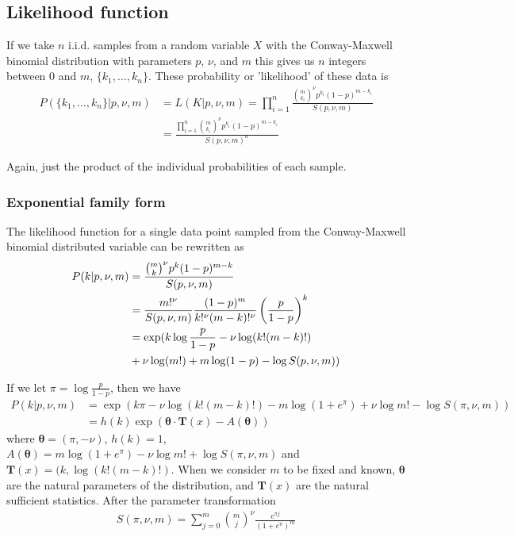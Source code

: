 \documentclass[a4paper,12pt]{article}
\theoremstyle{definition}
\begin{document}
\subsection{Likelihood function}
If we take $n$ i.i.d. samples from a random variable $X$ with the Conway-Maxwell binomial distribution with parameters $p$, $\nu$, and $m$ this gives us $n$ integers between $0$ and $m$, $\lbrace k_1, \dots , k_n \rbrace$. These probability or 'likelihood' of these data is
\begin{align}
  P(\lbrace k_1, \dots, k_n \rbrace | p, \nu, m) &= L(K | p, \nu, m) = \prod_{i=1}^{n} \frac{\binom{m}{k_i}^{\nu} p^{k_i} (1-p)^{m-k_i}}{S(p, \nu, m)} \\ 
  & = \frac{\prod_{i=1}^{n} \binom{m}{k_i}^{\nu} p^{k_i} (1-p)^{m-k_i}}{S(p, \nu, m)^n}
\end{align}

Again, just the product of the individual probabilities of each sample.

\subsubsection{Exponential family form}
The likelihood function for a single data point sampled from the Conway-Maxwell binomial distributed variable can be rewritten as 
\begin{align}
  P(k | p, \nu, m) & = \frac{\binom{m}{k}^{\nu} p^{k} (1-p)^{m-k}}{S(p, \nu, m)} \\
  & = \frac{m!^{\nu}}{S(p, \nu, m)} \frac{(1-p)^{m}}{k!^{\nu}(m - k)!^{\nu}} \left( \frac{p}{1-p} \right)^{k} \\
  & = \exp \large( k \log \frac{p}{1-p} - \nu \log(k!(m-k)!) \\ 
  & + \nu \log (m!)  + m \log (1 - p) - \log S(p, \nu, m) \large)
\end{align}

If we let $\pi = \log \frac{p}{1-p}$, then we have 
\begin{align}
  P(k | p, \nu, m) & = \exp \left( k \pi - \nu \log(k!(m-k)!) - m \log (1 + e^{\pi}) + \nu \log m!  - \log S(\pi, \nu, m) \right) \\ 
  & = h (k) \exp \left( \boldsymbol{\theta} \cdot \mathbf{T} (x) - A (\boldsymbol{\theta}) \right)
\end{align}
where $\boldsymbol{\theta} = (\pi, -\nu)$, $h(k) = 1$, $A(\boldsymbol{\theta}) = m \log (1 + e^{\pi}) - \nu \log m!  + \log S(\pi, \nu, m)$ and $\mathbf{T} (x) = (k, \log(k!(m-k)!)$.
When we consider $m$ to be fixed and known, $\boldsymbol{\theta}$ are the natural parameters of the distribution, and $\mathbf{T} (x)$ are the natural sufficient statistics. After the parameter transformation 
\begin{align}
  S(\pi, \nu, m) = \sum_{j=0}^{m} \binom{m}{j}^{\nu} \frac{e^{\pi j}}{(1 + e^{\pi})^m}
\end{align}
\end{document}
